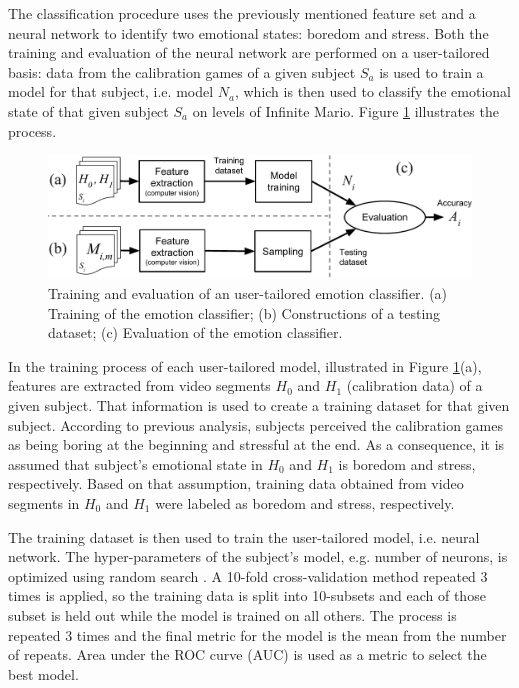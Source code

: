 The classification procedure uses the previously mentioned feature set and a neural network to identify two emotional states: boredom and stress. Both the training and evaluation of the neural network are performed on a user-tailored basis: data from the calibration games of a given subject $S_a$ is used to train a model for that subject, i.e. model $N_a$, which is then used to classify the emotional state of that given subject $S_a$ on levels of Infinite Mario. Figure \ref{fig:experiment2-training-evaluation} illustrates the process.

\begin{figure}[ht]
    \centering
    \includegraphics[width=\textwidth]{Content/figures/experiment2-training-evaluation}
    \caption{Training and evaluation of an user-tailored emotion classifier. (a) Training of the emotion classifier; (b) Constructions of a testing dataset; (c) Evaluation of the emotion classifier.}
    \label{fig:experiment2-training-evaluation}
\end{figure}

In the training process of each user-tailored model, illustrated in Figure \ref{fig:experiment2-training-evaluation}(a), features are extracted from video segments $H_0$ and $H_1$ (calibration data) of a given subject. That information is used to create a training dataset for that given subject. According to previous analysis, subjects perceived the calibration games as being boring at the beginning and stressful at the end. As a consequence, it is assumed that subject's emotional state in $H_0$ and $H_1$ is boredom and stress, respectively. Based on that assumption, training data obtained from video segments in $H_0$ and $H_1$ were labeled as boredom and stress, respectively.

The training dataset is then used to train the user-tailored model, i.e. neural network. The hyper-parameters of the subject's model, e.g. number of neurons, is optimized using random search \parencite{bergstra2012random}. A 10-fold cross-validation method repeated 3 times is applied, so the training data is split into 10-subsets and each of those subset is held out while the model is trained on all others. The process is repeated 3 times and the final metric for the model is the mean from the number of repeats. Area under the ROC curve (AUC) is used as a metric to select the best model.


